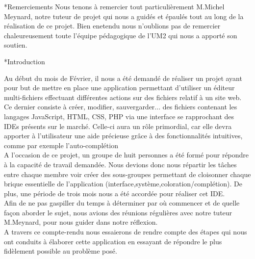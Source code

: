 \documentclass[a4paper, 12pt]{report}
\begin{document}
	\begin{chapter}*{Remerciements}
	Nous tenons à remercier tout particulièrement M.Michel Meynard, notre tuteur de projet qui nous a guidés et épaulés tout au long de la réalisation de ce projet. Bien enetendu nous n'oublions pas de remercier chaleureusement toute l'équipe pédagogique de l'UM2 qui nous a apporté son soutien. 
	\end{chapter} 
	\tableofcontents
	\begin{chapter}*{Introduction}
	Au début du mois de Février, il nous a été demandé de réaliser un projet ayant pour but de mettre en place une application permettant d'utiliser un éditeur multi-fichiers effectuant différentes actions sur des fichiers relatif à un site web.\\
	Ce dernier consiste à créer, modifier, sauvergarder... des fichiers contenant les langages JavaScript, HTML, CSS, PHP via une interface se rapprochant des IDEs présents sur le marché. Celle-ci aura un rôle primordial, car elle devra apporter à l'utilisateur une aide précieuse grâce à des fonctionnalités intuitives, comme par exemple l'auto-complétion\\
	A l'occasion de ce projet, un groupe de huit personnes a été formé pour répondre à la capacité de travail demandée. Nous devions donc nous répartir les tâches entre chaque membre voir créer des sous-groupes permettant de cloisonner chaque brique essentielle de l'application (interface,système,coloration/complétion). De plus, une période de trois mois nous a été accordée pour réaliser cet IDE.\\
	Afin de ne pas gaspiller du temps à déterminer par où commencer et de quelle façon aborder le sujet, nous avions des réunions régulières avec notre tuteur M.Meynard, pour nous guider dans notre réflexion.\\
	A travers ce compte-rendu nous essaierons de rendre compte des étapes qui nous ont conduits à élaborer cette application en essayant de répondre le plus fidèlement possible au problème posé.\\ 
	
	\end{chapter}
\end{document}
